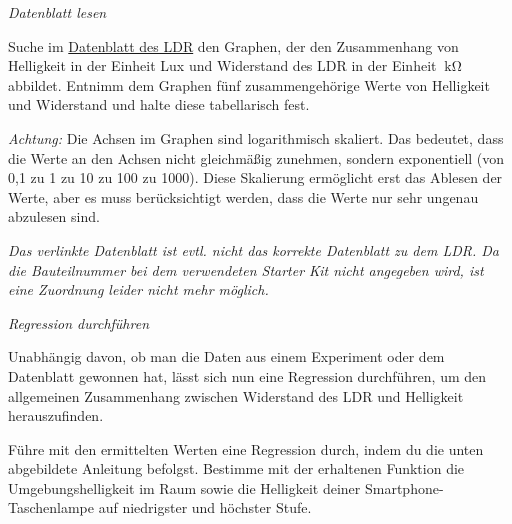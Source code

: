 \begin{aufgabe} \emph{Datenblatt lesen}
	
	Suche im \href{https://components101.com/sites/default/files/component_datasheet/LDR%20Datasheet.pdf}{Datenblatt des LDR}
	den Graphen, der den Zusammenhang von Helligkeit in der Einheit Lux und Widerstand des LDR in der Einheit $\SI{}{\kilo\ohm}$ abbildet. Entnimm dem Graphen fünf zusammengehörige Werte von Helligkeit und Widerstand und halte diese tabellarisch fest.
	
	\smallskip
	\begin{minipage}{0.78\textwidth}
		\emph{Achtung:} Die Achsen im Graphen sind logarithmisch skaliert. Das bedeutet, dass die Werte an den Achsen nicht gleichmäßig zunehmen, sondern exponentiell (von 0,1 zu 1 zu 10 zu 100 zu 1000). Diese Skalierung ermöglicht erst das Ablesen der Werte, aber es muss berücksichtigt werden, dass die Werte nur sehr ungenau abzulesen sind.
	\end{minipage}
	\hfill
	\begin{minipage}{0.2\textwidth}
	\end{minipage}
	
	\smallskip
	\textit{\small Das verlinkte Datenblatt ist evtl. nicht das korrekte Datenblatt zu dem LDR. Da die Bauteilnummer bei dem verwendeten Starter Kit nicht angegeben wird, ist eine Zuordnung leider nicht mehr möglich.}
\end{aufgabe}

\begin{aufgabe} \emph{Regression durchführen}
	
	Unabhängig davon, ob man die Daten aus einem Experiment oder dem Datenblatt gewonnen hat, lässt sich nun eine Regression durchführen, um den allgemeinen Zusammenhang zwischen Widerstand des LDR und Helligkeit herauszufinden.
	
	Führe mit den ermittelten Werten eine Regression durch, indem du die unten abgebildete Anleitung befolgst. Bestimme mit der erhaltenen Funktion die Umgebungshelligkeit im Raum sowie die Helligkeit deiner Smartphone-Taschenlampe auf niedrigster und höchster Stufe.
\end{aufgabe}

